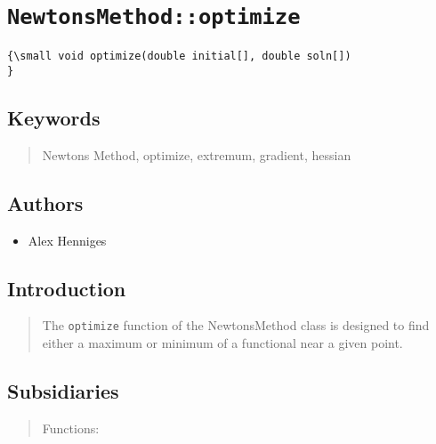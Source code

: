                       


\section*{\texttt{NewtonsMethod::optimize}}

\label{f0}{\small }
\begin{verbatim}
{\small void optimize(double initial[], double soln[])
}
\end{verbatim}

\subsection*{Keywords}

\begin{quotation}
Newtons Method, optimize, extremum, gradient, hessian
\end{quotation}

\subsection*{Authors}

\begin{itemize}
\item Alex Henniges
\end{itemize}

\subsection*{Introduction}

\begin{quotation}
The \texttt{optimize} function of the NewtonsMethod class is designed to
find either a maximum or minimum of a functional near a given point.
\end{quotation}

\subsection*{Subsidiaries}

\begin{quotation}
Functions:
\end{quotation}

